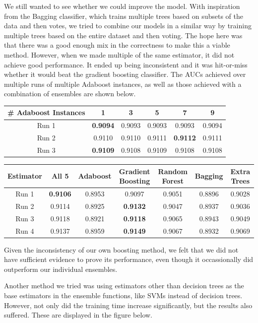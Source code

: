 \documentclass{article} %
\begin{document}
We still wanted to see whether we could improve the model.
With inspiration from the Bagging classifier, which trains multiple trees based
on subsets of the data and then votes, we tried to combine our models in a
similar way by training multiple trees based on the entire dataset and then
voting.  The hope here was that there was a good enough mix in the correctness
to make this a viable method.  However, when we made multiple of the same
estimator, it did not achieve good performance.  It ended up being inconsistent
and it was hit-or-miss whether it would beat the gradient boosting classifier.
The AUCs achieved over multiple runs of multiple Adaboost instances, as well as
those achieved with a combination of ensembles are shown below.

\begin{tabular}{c|ccccc}
\# Adaboost Instances & 1 & 3 & 5 & 7 & 9\\
\hline
Run 1 & \textbf{0.9094} & 0.9093 & 0.9093 & 0.9093 & 0.9094\\
Run 2 & 0.9110 & 0.9110 & 0.9111 & \textbf{0.9112} & 0.9111\\
Run 3 & \textbf{0.9109} & 0.9108 & 0.9109 & 0.9108 & 0.9108
\end{tabular}

\begin{adjustbox}{width=\textwidth,totalheight=\textheight,keepaspectratio}
\begin{tabular}
{c|cccccc}
Estimator & All 5 & Adaboost & Gradient Boosting & Random Forest & Bagging & Extra Trees\\
\hline
Run 1 & \textbf{0.9106} & 0.8953 & 0.9097 & 0.9051 & 0.8896 & 0.9028\\
Run 2 & 0.9114 & 0.8925 & \textbf{0.9132} & 0.9047 & 0.8937 & 0.9036\\
Run 3 & 0.9118 & 0.8921 & \textbf{0.9118} & 0.9065 & 0.8943 & 0.9049\\
Run 4 & 0.9137 & 0.8959 & \textbf{0.9149} & 0.9067 & 0.8932 & 0.9069
\end{tabular}
\end{adjustbox}

Given the inconsistency of our own boosting method, we felt that we did not have
sufficient evidence to prove its performance, even though it occassionally did
outperform our individual ensembles.

Another method we tried was using estimators other than decision trees as the
base estimators in the ensemble functions, like SVMs instead of decision trees.
However, not only did the training time increase significantly, but the results
also suffered. These are displayed in the figure below.
\end{document}
